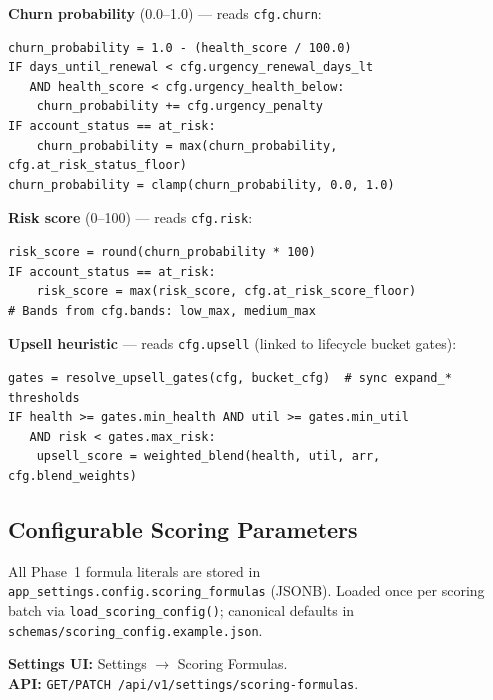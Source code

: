 \documentclass[11pt,a4paper]{article}
\begin{document}
\textbf{Churn probability} (0.0--1.0) --- reads \texttt{cfg.churn}:
\begin{lstlisting}
churn_probability = 1.0 - (health_score / 100.0)
IF days_until_renewal < cfg.urgency_renewal_days_lt
   AND health_score < cfg.urgency_health_below:
    churn_probability += cfg.urgency_penalty
IF account_status == at_risk:
    churn_probability = max(churn_probability, cfg.at_risk_status_floor)
churn_probability = clamp(churn_probability, 0.0, 1.0)
\end{lstlisting}

\textbf{Risk score} (0--100) --- reads \texttt{cfg.risk}:
\begin{lstlisting}
risk_score = round(churn_probability * 100)
IF account_status == at_risk:
    risk_score = max(risk_score, cfg.at_risk_score_floor)
# Bands from cfg.bands: low_max, medium_max
\end{lstlisting}

\textbf{Upsell heuristic} --- reads \texttt{cfg.upsell} (linked to lifecycle bucket gates):
\begin{lstlisting}
gates = resolve_upsell_gates(cfg, bucket_cfg)  # sync expand_* thresholds
IF health >= gates.min_health AND util >= gates.min_util
   AND risk < gates.max_risk:
    upsell_score = weighted_blend(health, util, arr, cfg.blend_weights)
\end{lstlisting}

\subsection{Configurable Scoring Parameters}

All Phase~1 formula literals are stored in \texttt{app\_settings.config.scoring\_formulas} (JSONB). Loaded once per scoring batch via \texttt{load\_scoring\_config()}; canonical defaults in \texttt{schemas/scoring\_config.example.json}.

\textbf{Settings UI:} Settings $\rightarrow$ Scoring Formulas.\\
\textbf{API:} \texttt{GET/PATCH /api/v1/settings/scoring-formulas}.
\end{document}
